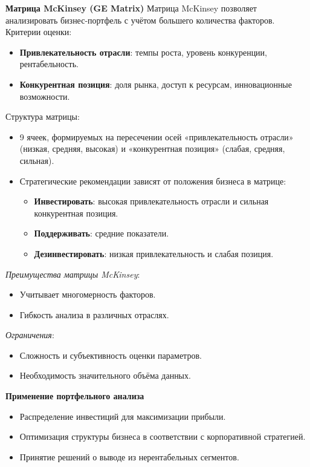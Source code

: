\textbf{Матрица McKinsey (GE Matrix)}
Матрица McKinsey позволяет анализировать бизнес-портфель с учётом большего количества факторов. Критерии оценки:
\begin{itemize}
    \item \textbf{Привлекательность отрасли}: темпы роста, уровень конкуренции, рентабельность.
    \item \textbf{Конкурентная позиция}: доля рынка, доступ к ресурсам, инновационные возможности.
\end{itemize}

Структура матрицы:
\begin{itemize}
    \item 9 ячеек, формируемых на пересечении осей «привлекательность отрасли» (низкая, средняя, высокая) и «конкурентная позиция» (слабая, средняя, сильная).
    \item Стратегические рекомендации зависят от положения бизнеса в матрице:
    \begin{itemize}
        \item \textbf{Инвестировать}: высокая привлекательность отрасли и сильная конкурентная позиция.
        \item \textbf{Поддерживать}: средние показатели.
        \item \textbf{Дезинвестировать}: низкая привлекательность и слабая позиция.
    \end{itemize}
\end{itemize}

\textit{Преимущества матрицы McKinsey}:
\begin{itemize}
    \item Учитывает многомерность факторов.
    \item Гибкость анализа в различных отраслях.
\end{itemize}

\textit{Ограничения}:
\begin{itemize}
    \item Сложность и субъективность оценки параметров.
    \item Необходимость значительного объёма данных.
\end{itemize}

\textbf{Применение портфельного анализа}
\begin{itemize}
    \item Распределение инвестиций для максимизации прибыли.
    \item Оптимизация структуры бизнеса в соответствии с корпоративной стратегией.
    \item Принятие решений о выводе из нерентабельных сегментов.
\end{itemize}
